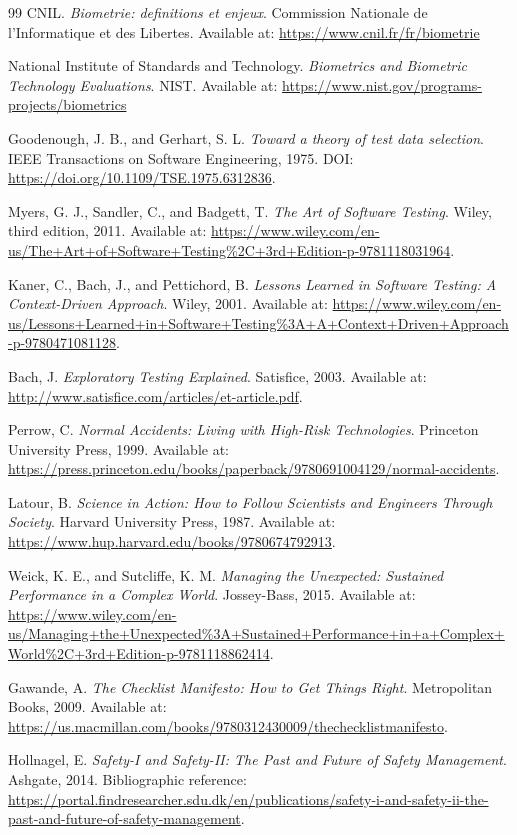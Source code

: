 \documentclass[11pt,a4paper]{article}
\begin{document}
\begin{thebibliography}{99}
CNIL.
\textit{Biometrie: definitions et enjeux}.
Commission Nationale de l'Informatique et des Libertes. Available at: \url{https://www.cnil.fr/fr/biometrie}

National Institute of Standards and Technology.
\textit{Biometrics and Biometric Technology Evaluations}.
NIST. Available at: \url{https://www.nist.gov/programs-projects/biometrics}

Goodenough, J. B., and Gerhart, S. L.
\textit{Toward a theory of test data selection}.
IEEE Transactions on Software Engineering, 1975. DOI: \url{https://doi.org/10.1109/TSE.1975.6312836}.

Myers, G. J., Sandler, C., and Badgett, T.
\textit{The Art of Software Testing}.
Wiley, third edition, 2011. Available at: \url{https://www.wiley.com/en-us/The+Art+of+Software+Testing%2C+3rd+Edition-p-9781118031964}.

Kaner, C., Bach, J., and Pettichord, B.
\textit{Lessons Learned in Software Testing: A Context-Driven Approach}.
Wiley, 2001. Available at: \url{https://www.wiley.com/en-us/Lessons+Learned+in+Software+Testing%3A+A+Context+Driven+Approach-p-9780471081128}.

Bach, J.
\textit{Exploratory Testing Explained}.
Satisfice, 2003. Available at: \url{http://www.satisfice.com/articles/et-article.pdf}.

Perrow, C.
\textit{Normal Accidents: Living with High-Risk Technologies}.
Princeton University Press, 1999. Available at: \url{https://press.princeton.edu/books/paperback/9780691004129/normal-accidents}.

Latour, B.
\textit{Science in Action: How to Follow Scientists and Engineers Through Society}.
Harvard University Press, 1987. Available at: \url{https://www.hup.harvard.edu/books/9780674792913}.

Weick, K. E., and Sutcliffe, K. M.
\textit{Managing the Unexpected: Sustained Performance in a Complex World}.
Jossey-Bass, 2015. Available at: \url{https://www.wiley.com/en-us/Managing+the+Unexpected%3A+Sustained+Performance+in+a+Complex+World%2C+3rd+Edition-p-9781118862414}.

Gawande, A.
\textit{The Checklist Manifesto: How to Get Things Right}.
Metropolitan Books, 2009. Available at: \url{https://us.macmillan.com/books/9780312430009/thechecklistmanifesto}.

Hollnagel, E.
\textit{Safety-I and Safety-II: The Past and Future of Safety Management}.
Ashgate, 2014. Bibliographic reference: \url{https://portal.findresearcher.sdu.dk/en/publications/safety-i-and-safety-ii-the-past-and-future-of-safety-management}.


\end{thebibliography}
\end{document}
